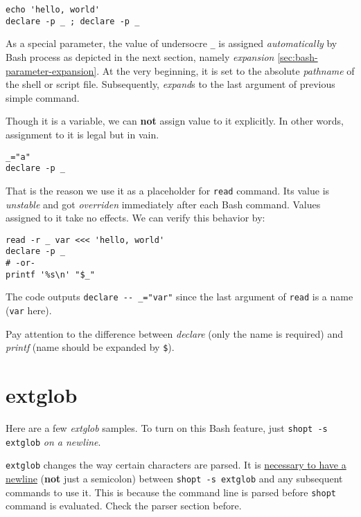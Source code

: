 \begin{lstlisting}
echo 'hello, world'
declare -p _ ; declare -p _
\end{lstlisting}

As a special parameter, the value of undersocre \verb|_| is
assigned \textit{automatically} by Bash process as depicted in the
next section, namely \textit{expansion}
\ref{sec:bash-parameter-expansion}. At the very beginning, it is
set to the absolute \textit{pathname} of the shell or script
file. Subsequently, \textit{expand}s to the last argument of
previous simple command.

Though it is a variable, we can \textbf{not} assign value to it
explicitly. In other words, assignment to it is legal but in vain.

\begin{lstlisting}
_="a"
declare -p _
\end{lstlisting}

That is the reason we use it as a placeholder for \lstinline|read|
command. Its value is \textit{unstable} and got \textit{overriden}
immediately after each Bash command. Values assigned to it take no
effects. We can verify this behavior by:

\begin{lstlisting}
read -r _ var <<< 'hello, world'
declare -p _
# -or-
printf '%s\n' "$_"
\end{lstlisting}

The code outputs \lstinline|declare -- _="var"| since the last
argument of \lstinline|read| is a name (\verb|var| here).

Pay attention to the difference between \textit{declare} (only the
name is required) and \textit{printf} (name should be expanded by
\lstinline|$|).

\section{extglob}
\label{sec:bash-extglob}

Here are a few \textit{extglob} samples. To turn on this Bash
feature, just \lstinline|shopt -s extglob| \textit{on a newline}.

\lstinline|extglob| changes the way certain characters are
parsed. It is
\href{https://mywiki.wooledge.org/glob#extglob}{necessary to have
  a newline} (\textbf{not} just a semicolon) between
\lstinline|shopt -s extglob| and any subsequent commands to use
it. This is because the command line is parsed before
\lstinline|shopt| command is evaluated. Check the parser section
before.

